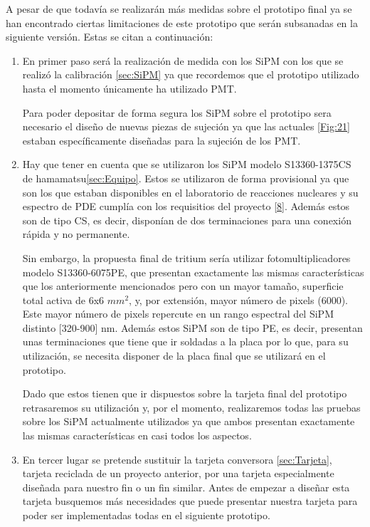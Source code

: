 A pesar de que todavía se realizarán más medidas sobre el prototipo final ya se han encontrado ciertas limitaciones de este prototipo que serán subsanadas  en la siguiente versión. Estas se citan a continuación:
\begin{enumerate}
\item{} En primer paso será la realización de medida con los SiPM con los que se realizó la calibración \ref{sec:SiPM} ya que recordemos que el prototipo utilizado hasta el momento únicamente ha utilizado PMT. 

Para poder depositar de forma segura los SiPM sobre el prototipo sera necesario el diseño de nuevas piezas de sujeción ya que las actuales \ref{Fig:21} estaban específicamente diseñadas para la sujeción de los PMT.

\item{} Hay que tener en cuenta que se utilizaron los SiPM modelo S13360-1375CS de hamamatsu\ref{sec:Equipo}. Estos se utilizaron de forma provisional ya que son los que estaban disponibles en el laboratorio de reacciones nucleares y su espectro de PDE cumplía con los requisitios del proyecto \ref{8}. Además estos son de tipo CS, es decir, disponían de dos terminaciones para una conexión rápida y no permanente. 

Sin embargo, la propuesta final de tritium sería utilizar fotomultiplicadores modelo S13360-6075PE,  que presentan exactamente las mismas características que los anteriormente mencionados pero con un mayor tamaño, superficie total activa de 6x6 $mm^2$, y, por extensión, mayor número de pixels (6000). Este mayor número de pixels repercute en un rango espectral del SiPM distinto [320-900] nm. Además estos SiPM son de tipo PE, es decir, presentan unas terminaciones que tiene que ir soldadas a la placa por lo que, para su utilización, se necesita disponer de la placa final que se utilizará en el prototipo. 

Dado que estos tienen que ir dispuestos sobre la tarjeta final del prototipo retrasaremos su utilización y, por el momento, realizaremos todas las pruebas sobre los SiPM actualmente utilizados ya que ambos presentan exactamente las mismas características en casi todos los aspectos.

\item{} En tercer lugar se pretende sustituir la tarjeta conversora \ref{sec:Tarjeta}, tarjeta reciclada de un proyecto anterior, por una tarjeta especialmente diseñada para nuestro fin o un fin similar. Antes de empezar a diseñar esta tarjeta busquemos más necesidades que puede presentar nuestra tarjeta para poder ser implementadas todas en el siguiente prototipo.


\end{enumerate}
